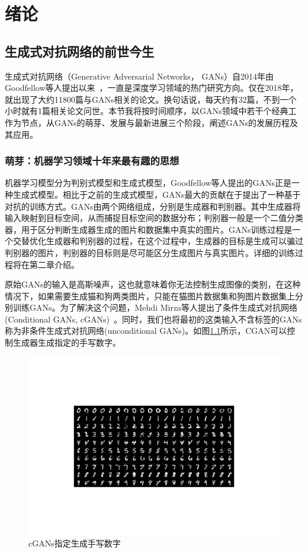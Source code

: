 \chapter{绪论}

\section{生成式对抗网络的前世今生}

生成式对抗网络（Generative Adversarial Networks， GANs）自2014年由Goodfellow等人提出以来~\cite{GANs}，一直是深度学习领域的热门研究方向。仅在2018年，就出现了大约11800篇与GANs相关的论文。换句话说，每天约有32篇，不到一个小时就有1篇相关论文问世\cite{review}。本节我将按时间顺序，以GANs领域中若干个经典工作为节点，从GANs的萌芽、发展与最新进展三个阶段，阐述GANs的发展历程及其应用。

\subsection{萌芽：机器学习领域十年来最有趣的思想}
机器学习模型分为判别式模型和生成式模型，Goodfellow等人提出的GANs正是一种生成式模型。相比于之前的生成式模型，GANs最大的贡献在于提出了一种基于对抗的训练方式。GANs由两个网络组成，分别是生成器和判别器。其中生成器将输入映射到目标空间，从而捕捉目标空间的数据分布；判别器一般是一个二值分类器，用于区分判断生成器生成的图片和数据集中真实的图片。GANs训练过程是一个交替优化生成器和判别器的过程，在这个过程中，生成器的目标是生成可以骗过判别器的图片，判别器的目标则是尽可能区分生成图片与真实图片。详细的训练过程将在第二章介绍。

原始GANs的输入是高斯噪声，这也就意味着你无法控制生成图像的类别，在这种情况下，如果需要生成猫和狗两类图片，只能在猫图片数据集和狗图片数据集上分别训练GANs。为了解决这个问题，Mehdi Mirza等人提出了条件生成式对抗网络(Conditional GANs, cGANs)~\cite{CGANs}。同时，我们也将最初的这类输入不含标签的GANs称为非条件生成式对抗网络(unconditional GANs)。如图\ref{CGAN-result}所示，CGAN可以控制生成器生成指定的手写数字。

\begin{figure}
    \centering
    \includegraphics[width=\textwidth]{figures/CGAN-result.pdf}
    \caption{cGANs指定生成手写数字}
    \label{CGAN-result}
\end{figure}

